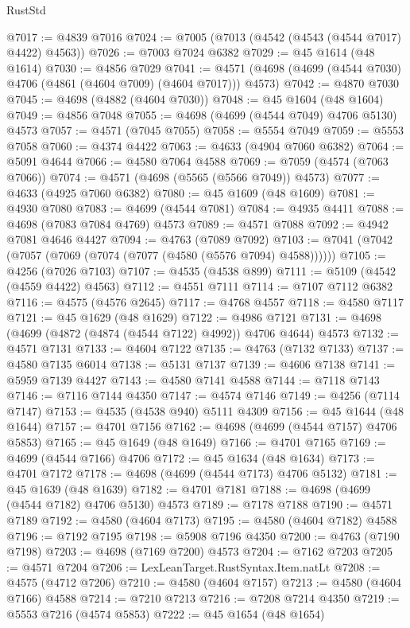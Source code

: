 \begin{lexlean}{RustStd}
\begin{coremodule}
@7017 := @4839 @7016
@7024 := @7005 (@7013 (@4542 (@4543 (@4544 @7017) @4422) @4563))
@7026 := @7003 @7024 @6382
@7029 := @45 @1614 (@48 @1614)
@7030 := @4856 @7029
@7041 := @4571 (@4698 (@4699 (@4544 @7030) @4706 (@4861 (@4604 @7009) (@4604 @7017))) @4573)
@7042 := @4870 @7030
@7045 := @4698 (@4882 (@4604 @7030))
@7048 := @45 @1604 (@48 @1604)
@7049 := @4856 @7048
@7055 := @4698 (@4699 (@4544 @7049) @4706 @5130) @4573
@7057 := @4571 (@7045 @7055)
@7058 := @5554 @7049
@7059 := @5553 @7058
@7060 := @4374 @4422
@7063 := @4633 (@4904 @7060 @6382)
@7064 := @5091 @4644
@7066 := @4580 @7064 @4588
@7069 := @7059 (@4574 (@7063 @7066))
@7074 := @4571 (@4698 (@5565 (@5566 @7049)) @4573)
@7077 := @4633 (@4925 @7060 @6382)
@7080 := @45 @1609 (@48 @1609)
@7081 := @4930 @7080
@7083 := @4699 (@4544 @7081)
@7084 := @4935 @4411
@7088 := @4698 (@7083 @7084 @4769) @4573
@7089 := @4571 @7088
@7092 := @4942 @7081 @4646 @4427
@7094 := @4763 (@7089 @7092)
@7103 := @7041 (@7042 (@7057 (@7069 (@7074 (@7077 (@4580 (@5576 @7094) @4588))))))
@7105 := @4256 (@7026 @7103)
@7107 := @4535 (@4538 @899)
@7111 := @5109 (@4542 (@4559 @4422) @4563)
@7112 := @4551 @7111
@7114 := @7107 @7112 @6382
@7116 := @4575 (@4576 @2645)
@7117 := @4768 @4557
@7118 := @4580 @7117
@7121 := @45 @1629 (@48 @1629)
@7122 := @4986 @7121
@7131 := @4698 (@4699 (@4872 (@4874 (@4544 @7122) @4992)) @4706 @4644) @4573
@7132 := @4571 @7131
@7133 := @4604 @7122
@7135 := @4763 (@7132 @7133)
@7137 := @4580 @7135 @6014
@7138 := @5131 @7137
@7139 := @4606 @7138
@7141 := @5959 @7139 @4427
@7143 := @4580 @7141 @4588
@7144 := @7118 @7143
@7146 := @7116 @7144 @4350
@7147 := @4574 @7146
@7149 := @4256 (@7114 @7147)
@7153 := @4535 (@4538 @940) @5111 @4309
@7156 := @45 @1644 (@48 @1644)
@7157 := @4701 @7156
@7162 := @4698 (@4699 (@4544 @7157) @4706 @5853)
@7165 := @45 @1649 (@48 @1649)
@7166 := @4701 @7165
@7169 := @4699 (@4544 @7166) @4706
@7172 := @45 @1634 (@48 @1634)
@7173 := @4701 @7172
@7178 := @4698 (@4699 (@4544 @7173) @4706 @5132)
@7181 := @45 @1639 (@48 @1639)
@7182 := @4701 @7181
@7188 := @4698 (@4699 (@4544 @7182) @4706 @5130) @4573
@7189 := @7178 @7188
@7190 := @4571 @7189
@7192 := @4580 (@4604 @7173)
@7195 := @4580 (@4604 @7182) @4588
@7196 := @7192 @7195
@7198 := @5908 @7196 @4350
@7200 := @4763 (@7190 @7198)
@7203 := @4698 (@7169 @7200) @4573
@7204 := @7162 @7203
@7205 := @4571 @7204
@7206 := LexLeanTarget.RustSyntax.Item.natLt
@7208 := @4575 (@4712 @7206)
@7210 := @4580 (@4604 @7157)
@7213 := @4580 (@4604 @7166) @4588
@7214 := @7210 @7213
@7216 := @7208 @7214 @4350
@7219 := @5553 @7216 (@4574 @5853)
@7222 := @45 @1654 (@48 @1654)

\end{coremodule}
\end{lexlean}
